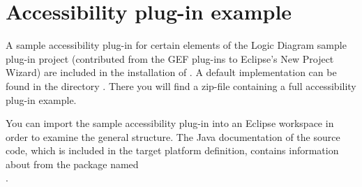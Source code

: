 \section{Accessibility plug-in example}
\label{gefreference}
A sample accessibility plug-in for certain elements of the Logic Diagram sample
plug-in project (contributed from the GEF plug-ins to Eclipse's New Project
Wizard) are included in the installation of \app{}. A default implementation can
be found in the directory . There you will
find a zip-file containing a full accessibility plug-in example.

You can import the sample accessibility plug-in into an Eclipse workspace in
order to examine the general structure. %
The Java documentation of the source code, which is included in the target
platform definition, contains information about 
from the package named\\
.


